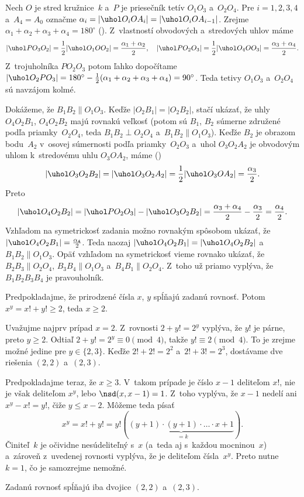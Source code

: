 {%
Nech $O$ je stred kružnice~$k$ a~$P$ je priesečník tetív $O_1O_3$ a~$O_2O_4$. Pre $i=1,2,3,4$ a~$A_4=A_0$ označme $\alpha_i=|\uhol O_iOA_i|=|\uhol O_iOA_{i-1}|$. Zrejme $\alpha_1+\alpha_2+\alpha_3+\alpha_4=180^\circ$ (\obr). Z~vlastností obvodových a~stredových uhlov máme
$$
|\uhol PO_3O_2|=\frac12|\uhol O_1OO_2|=\frac{\alpha_1+\alpha_2}2,\quad
|\uhol PO_2O_3|=\frac12|\uhol O_4OO_3|=\frac{\alpha_3+\alpha_4}2.
$$
Z~trojuholníka $PO_2O_3$ potom ľahko dopočítame $|\uhol O_2PO_3|=180^\circ-\frac12(\alpha_1+\alpha_2+\alpha_3+\alpha_4)=90^\circ$. Teda tetivy $O_1O_3$ a~$O_2O_4$ sú navzájom kolmé.
%

Dokážeme, že $B_1B_2\parallel O_1O_3$. Keďže $|O_2B_1|=|O_2B_2|$, stačí ukázať, že uhly $O_4O_2B_1$, $O_4O_2B_2$ majú rovnakú veľkosť (potom sú $B_1$, $B_2$ súmerne združené podľa priamky~$O_2O_4$, teda $B_1B_2\perp O_2O_4$ a~$B_1B_2\parallel O_1O_3$). Keďže $B_2$ je obrazom bodu~$A_2$ v~osovej súmernosti podľa priamky~$O_2O_3$ a~uhol $O_3O_2A_2$ je obvodovým uhlom k~stredovému uhlu $O_3OA_2$, máme (\obr)
$$
|\uhol O_3O_2B_2|=|\uhol O_3O_2A_2|=\frac12|\uhol O_3OA_2|=\frac{\alpha_3}2.
$$
Preto
$$
|\uhol O_4O_2B_2|=|\uhol PO_2O_3|-|\uhol O_3O_2B_2|=\frac{\alpha_3+\alpha_4}2-\frac{\alpha_3}2=\frac{\alpha_4}2.
$$
Vzhľadom na symetrickosť zadania možno rovnakým spôsobom ukázať, že $|\uhol O_4O_2B_1|=\frac{\alpha_4}2$. Teda naozaj $|\uhol O_4O_2B_1|=|\uhol O_4O_2B_2|$ a~$B_1B_2\parallel O_1O_3$. Opäť vzhľadom na symetrickosť vieme rovnako ukázať, že $B_2B_3\parallel O_2O_4$, $B_3B_4\parallel O_1O_3$ a~$B_4B_1\parallel O_2O_4$. Z~toho už priamo vyplýva, že $B_1B_2B_3B_4$ je pravouholník.
%
}

{%
Predpokladajme, že prirodzené čísla $x$, $y$ spĺňajú zadanú rovnosť. Potom $x^y=x!+y!\ge2$, teda $x\ge2$.

Uvažujme najprv prípad $x=2$. Z~rovnosti $2+y!=2^y$ vyplýva, že $y!$ je párne, preto $y\ge2$. Odtiaľ $2+y!=2^y\equiv0\pmod4$, takže $y!\equiv2\pmod4$. To je zrejme možné jedine pre $y\in\{2,3\}$. Keďže $2!+2!=2^2$ a~$2!+3!=2^3$, dostávame dve riešenia $(2,2)$ a~$(2,3)$.

Predpokladajme teraz, že $x\ge3$. V~takom prípade je číslo $x-1$ deliteľom $x!$, nie je však deliteľom $x^y$, lebo $\nsd(x,x-1)=1$. Z~toho vyplýva, že $x-1$ nedelí ani $x^y-x!=y!$, čiže $y\le x-2$. Môžeme teda písať
$$
x^y=x!+y!=y!(\underbrace{(y+1)\cdot(y+1)\cdot\dots\cdot x+1}_{\phantom{k}=k}).
$$
Činiteľ~$k$ je očividne nesúdeliteľný s~$x$ (a~teda aj s~každou mocninou~$x$) a~zároveň z~uvedenej rovnosti vyplýva, že je deliteľom čísla~$x^y$. Preto nutne $k=1$, čo je samozrejme nemožné.

Zadanú rovnosť spĺňajú iba dvojice $(2,2)$ a~$(2,3)$.
}

